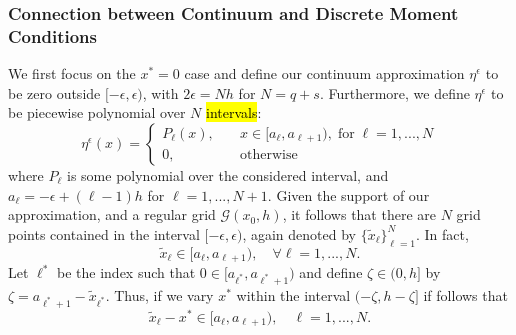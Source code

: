 %



\subsubsection{Connection between Continuum and Discrete Moment Conditions}

We first focus on the $x^*=0$ case and define our continuum approximation $\eta^\epsilon$ to be zero outside $[-\epsilon,\epsilon)$, with $2\epsilon=Nh$ for $N=q+s$. 
Furthermore, we define $\eta^\epsilon$ to be piecewise polynomial over $N$ \hl{intervals}: %
 \begin{equation}\label{eq:eta}
 	\eta^\epsilon(x) = \left\{ \begin{array}{rl}
		P_\ell(x),& \quad x\in[a_\ell,a_{\ell+1}), \; \text{for}\; \ell=1,...,N\\
		0,& \quad \text{otherwise}
	\end{array}\right.
 \end{equation}
where $P_\ell$ is some polynomial over the considered interval, and $a_{\ell}=-\epsilon+ (\ell-1)h$ for $\ell=1,...,N+1$.
Given the support of our approximation, and a regular grid $\mathcal G(x_0,h)$, it follows that there are $N$ grid points contained in the interval $[-\epsilon,\epsilon)$, again denoted by $\{\tilde x_\ell\}_{\ell=1}^N$.
In fact,
\[
	\tilde x_\ell \in [a_\ell,a_{\ell+1}), \quad \forall \ell=1,...,N.
\]
Let $\ell^*$ be the index such that $0\in[a_{\ell^*},a_{\ell^*+1})$ and define $\zeta\in(0,h]$ by $\zeta=a_{\ell^*+1}-\tilde x_{\ell^*}$.
Thus, if we vary $x^*$ within the interval $(-\zeta,h-\zeta]$ if follows that
\[
	\tilde x_\ell - x^* \in [a_\ell,a_{\ell+1}), \quad \ell=1,...,N.
\]


